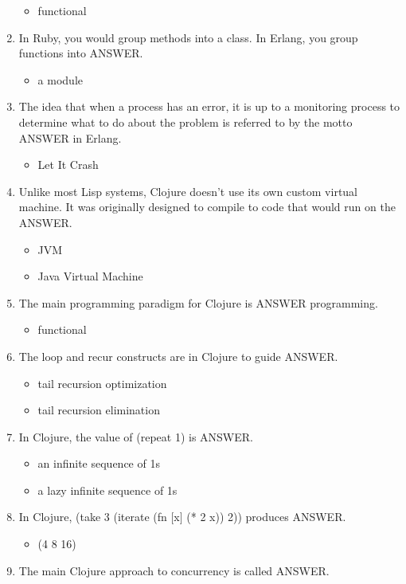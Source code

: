 \documentclass{exam}
\begin{document}
\begin{enumerate}
\begin{itemize}
\item functional
\end{itemize}
\item In Ruby, you would group methods into a class.  In Erlang, you group functions into ANSWER.
\begin{itemize}
\item a module
\end{itemize}
\item The idea that when a process has an error, it is up to a monitoring process to determine what to do about the problem is referred to by the motto ANSWER in Erlang.
\begin{itemize}
\item Let It Crash
\end{itemize}
\item Unlike most Lisp systems, Clojure doesn't use its own custom virtual machine.  It was originally designed to compile to code that would run on the ANSWER.
\begin{itemize}
\item JVM
\item Java Virtual Machine
\end{itemize}
\item The main programming paradigm for Clojure is ANSWER programming.
\begin{itemize}
\item functional
\end{itemize}
\item The loop and recur constructs are in Clojure to guide ANSWER.
\begin{itemize}
\item tail recursion optimization
\item tail recursion elimination
\end{itemize}
\item In Clojure, the value of (repeat 1) is ANSWER.
\begin{itemize}
\item an infinite sequence of 1s
\item a lazy infinite sequence of 1s
\end{itemize}
\item In Clojure, (take 3 (iterate (fn $\lbrack$x$\rbrack$ (* 2 x)) 2)) produces ANSWER.
\begin{itemize}
\item (4 8 16)
\end{itemize}
\item The main Clojure approach to concurrency is called ANSWER.

\end{enumerate}
\end{document}
